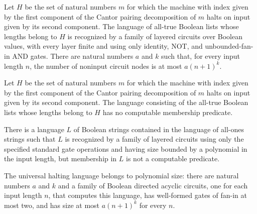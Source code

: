 \begin{theorem}
\label{Language.uhalt_inLayeredPPoly}
\leanok
{}
Let $H$ be the set of natural numbers $m$ for which the machine with index given by the
first component of the Cantor pairing decomposition of $m$ halts on input given by its
second component. The language of all-true Boolean lists whose lengths belong to $H$ is
recognized by a family of layered circuits over Boolean values, with every layer finite
and using only identity, NOT, and unbounded-fan-in AND gates. There are natural numbers
$a$ and $k$ such that, for every input length $n$, the number of noninput circuit nodes
is at most $a(n+1)^k$.
\end{theorem}

\begin{theorem}
\label{Language.not_computablePred_mem_uhalt}
\leanok
{}
Let $H$ be the set of natural numbers $m$ for which the machine with index given by the
first component of the Cantor pairing decomposition of $m$ halts on input given by its
second component. The language consisting of the all-true Boolean lists whose lengths
belong to $H$ has no computable membership predicate.
\end{theorem}

\begin{theorem}
\label{Language.exists_le_allOnes_inLayeredPPoly_not_computablePred}
\leanok
{}
There is a language $L$ of Boolean strings contained in the language of all-ones strings
such that $L$ is recognized by a family of layered circuits using only the specified
standard gate operations and having size bounded by a polynomial in the input length,
but membership in $L$ is not a computable predicate.
\end{theorem}

\begin{theorem}
\label{Language.uhalt_inPPoly}
\leanok
{}
The universal halting language belongs to polynomial size: there are natural numbers $a$
and $k$ and a family of Boolean directed acyclic circuits, one for each input length
$n$, that computes this language, has well-formed gates of fan-in at most two, and has
size at most $a(n+1)^k$ for every $n$.
\end{theorem}

